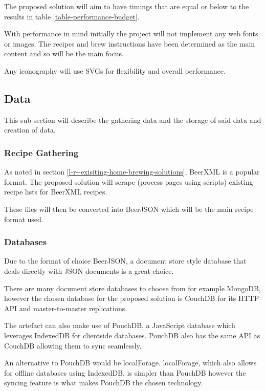 The proposed solution will aim to have timings that are equal or below to the results in table \ref{table-performance-budget}.

With performance in mind initially the project will not implement any web fonts or images. The recipes and brew instructions have been determined as the main content and so will be the main focus.

Any iconography will use SVGs for flexibility and overall performance.

\subsection{Data} \label{a-d--data}

This sub-section will describe the gathering data and the storage of said data and creation of data.

\subsubsection{Recipe Gathering} \label{a-d--d--recipe-gathering}

As noted in section \ref{l-r--exisiting-home-brewing-solutions}, BeerXML is a popular format.
The proposed solution will scrape (process pages using scripts) existing recipe lists for BeerXML recipes.

These files will then be converted into BeerJSON which will be the main recipe format used.

\subsubsection{Databases} \label{a-d--d--databases}

Due to the format of choice BeerJSON, a document store style database that deals directly with JSON documents is a great choice.

There are many document store databases to choose from for example MongoDB, however the chosen database for the proposed solution is CouchDB for its HTTP API and master-to-master replications. \cite{couchdb}

The artefact can also make use of PouchDB, a JavaScript database which leverages IndexedDB for clientside databases. PouchDB also has the same API as CouchDB allowing them to sync seamlessly.

An alternative to PouchDB would be localForage. localForage, which also allows for offline databases using IndexedDB, is simpler than PouchDB however the syncing feature is what makes PouchDB the chosen technology.

